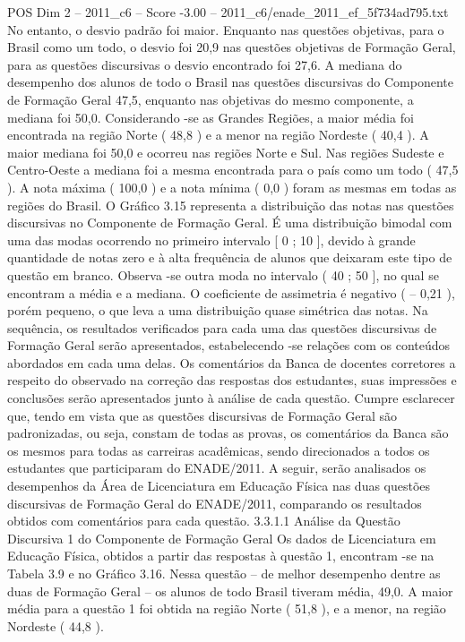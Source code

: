 \begin{textsample}{POS Dim 2 – 2011\_c6 – Score -3.00 – 2011\_c6/enade\_2011\_ef\_5f734ad795.txt}
No entanto, o desvio padrão foi maior.
Enquanto nas questões objetivas, para o Brasil como um todo, o desvio foi 20,9 nas questões objetivas de Formação Geral, para as questões discursivas o desvio encontrado foi 27,6.
A mediana do desempenho dos alunos de todo o Brasil nas questões discursivas do Componente de Formação Geral 47,5, enquanto nas objetivas do mesmo componente, a mediana foi 50,0.
Considerando -se as Grandes Regiões, a maior média foi encontrada na região Norte ( 48,8 ) e a menor na região Nordeste ( 40,4 ).
A maior mediana foi 50,0 e ocorreu nas regiões Norte e Sul.
Nas regiões Sudeste e Centro-Oeste a mediana foi a mesma encontrada para o país como um todo ( 47,5 ).
A nota máxima ( 100,0 ) e a nota mínima ( 0,0 ) foram as mesmas em todas as regiões do Brasil.
O Gráfico 3.15 representa a distribuição das notas nas questões discursivas no Componente de Formação Geral.
É uma distribuição bimodal com uma das modas ocorrendo no primeiro intervalo [ 0 ; 10 ], devido à grande quantidade de notas zero e à alta frequência de alunos que deixaram este tipo de questão em branco.
Observa -se outra moda no intervalo ( 40 ; 50 ], no qual se encontram a média e a mediana.
O coeficiente de assimetria é negativo ( – 0,21 ), porém pequeno, o que leva a uma distribuição quase simétrica das notas.
Na sequência, os resultados verificados para cada uma das questões discursivas de Formação Geral serão apresentados, estabelecendo -se relações com os conteúdos abordados em cada uma delas.
Os comentários da Banca de docentes corretores a respeito do observado na correção das respostas dos estudantes, suas impressões e conclusões serão apresentados junto à análise de cada questão.
Cumpre esclarecer que, tendo em vista que as questões discursivas de Formação Geral são padronizadas, ou seja, constam de todas as provas, os comentários da Banca são os mesmos para todas as carreiras acadêmicas, sendo direcionados a todos os estudantes que participaram do ENADE/2011.
A seguir, serão analisados os desempenhos da Área de Licenciatura em Educação Física nas duas questões discursivas de Formação Geral do ENADE/2011, comparando os resultados obtidos com comentários para cada questão. 3.3.1.1 Análise da Questão Discursiva 1 do Componente de Formação Geral Os dados de Licenciatura em Educação Física, obtidos a partir das respostas à questão 1, encontram -se na Tabela 3.9 e no Gráfico 3.16.
Nessa questão – de melhor desempenho dentre as duas de Formação Geral – os alunos de todo Brasil tiveram média, 49,0.
A maior média para a questão 1 foi obtida na região Norte ( 51,8 ), e a menor, na região Nordeste ( 44,8 ).

\end{textsample}
